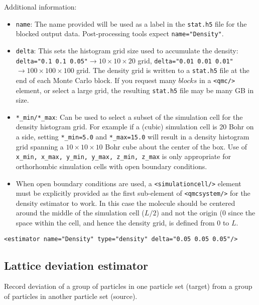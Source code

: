 Additional information:
\begin{itemize}
  \item{\texttt{name}: The name provided will be used as a label in the \texttt{stat.h5} file for the blocked output data.  Post-processing tools expect \texttt{name="Density"}.}
  \item{\texttt{delta}:  This sets the histogram grid size used to accumulate the density: \texttt{delta="0.1 0.1 0.05"}$\rightarrow 10\times 10\times 20$ grid, \texttt{delta="0.01 0.01 0.01"}$\rightarrow 100\times 100\times 100$ grid.  The density grid is written to a \texttt{stat.h5} file at the end of each Monte Carlo block.  If you request many $blocks$ in a \texttt{<qmc/>} element, or select a large grid, the resulting \texttt{stat.h5} file may be many GB in size.}
  \item{\texttt{*\_min/*\_max}: Can be used to select a subset of the simulation cell for the density histogram grid.  For example if a (cubic) simulation cell is 20 Bohr on a side, setting \texttt{*\_min=5.0} and \texttt{*\_max=15.0} will result in a density histogram grid spanning a $10\times 10\times 10$ Bohr cube about the center of the box.  Use of \texttt{x\_min, x\_max, y\_min, y\_max, z\_min, z\_max} is only appropriate for orthorhombic simulation cells with open boundary conditions.}
  \item{When open boundary conditions are used, a \texttt{<simulationcell/>} element must be explicitly provided as the first sub-element of \texttt{<qmcsystem/>} for the density estimator to work.  In this case the molecule should be centered around the middle of the simulation cell ($L/2$) and not the origin ($0$} since the space within the cell, and hence the density grid, is defined from $0$ to $L$.
\end{itemize}


\begin{lstlisting}[caption=Density estimator (uniform grid).]
   <estimator name="Density" type="density" delta="0.05 0.05 0.05"/>
\end{lstlisting}

\subsection{Lattice deviation estimator}
Record deviation of a group of particles in one particle set (target) from a group of particles in another particle set (source).

